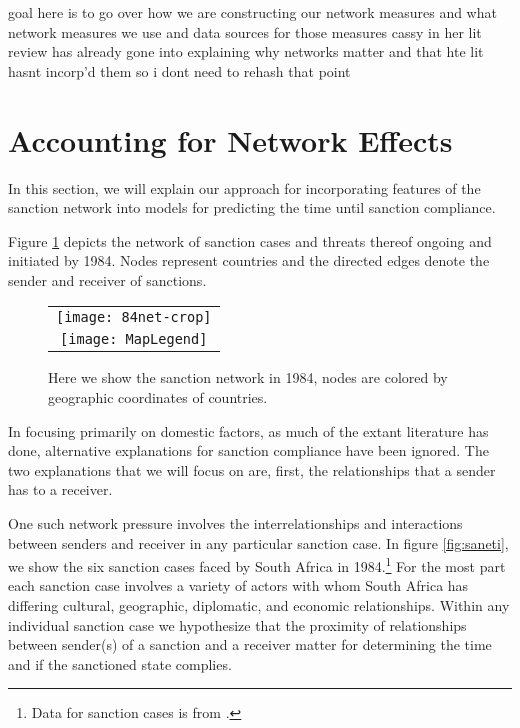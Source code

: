 
goal here is to go over how we are constructing our network measures and what network measures we use and data sources for those measures
cassy in her lit review has already gone into explaining why networks matter and that hte lit hasnt incorp'd them so i dont need to rehash that point

\section*{Accounting for Network Effects}
\label{neteffects}

In this section, we will explain our approach for incorporating features of the sanction network into models for predicting the time until sanction compliance. 

Figure \ref{fig:spaghetti} depicts the network of sanction cases and threats thereof ongoing and initiated by 1984. Nodes represent countries and the directed edges denote the sender and receiver of sanctions. 

\begin{figure}[ht]
  \centering
  \begin{tabular}{c}
	  \texttt{[image: 84net-crop]} \\
	  \texttt{[image: MapLegend]}
  \end{tabular}
  \caption{Here we show the sanction network in 1984, nodes are colored by geographic coordinates of countries.}
  \label{fig:spaghetti}
\end{figure}
\FloatBarrier

In focusing primarily on domestic factors, as much of the extant literature has done, alternative explanations for sanction compliance have been ignored. The two explanations that we will focus on are, first, the relationships that a sender has to a receiver. 

One such network pressure involves the interrelationships and interactions between senders and receiver in any particular sanction case. In figure \ref{fig:saneti}, we show the six sanction cases faced by South Africa in 1984.\footnote{Data for sanction cases is from \citet{morgan2009threat}.} For the most part each sanction case involves a variety of actors with whom South Africa has differing cultural, geographic, diplomatic, and economic relationships. Within any individual sanction case we hypothesize that the proximity of relationships between sender(s) of a sanction and a receiver matter for determining the time and if the sanctioned state complies. 

